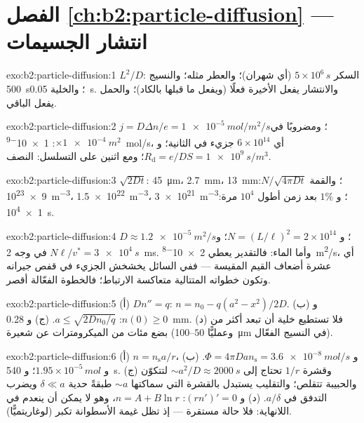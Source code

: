 \section*{الفصل \ref{ch:b2:particle-diffusion} --- انتشار الجسيمات}

\begin{solution}{exo:b2:particle-diffusion:1}
$L^2/D$: السكر $5 \times 10^6\,\unit{s}$ (أي شهران)؛ والعطر مثله؛
والنسيج \qty{500}{s}؛ والخلية \qty{0.05}{s}. والانتشار يفعل الأخيرة
فعلًا (ويفعل ما قبلها بالكاد)؛ والحمل يفعل الباقي.
\end{solution}

\begin{solution}{exo:b2:particle-diffusion:2}
$j = D\Delta n/e = \qty{1e-5}{mol/m^2/s}$؛ ومضروبًا في $\times \qty{1e-4}{m^2}$:
\qty{1e-9}{mol/s}، أي $6 \times 10^{14}$ جزيء في الثانية؛
و $R_{\text{d}} = e/DS = \qty{1e9}{s/m^3}$؛ ومع اثنين على التسلسل: النصف.
\end{solution}

\begin{solution}{exo:b2:particle-diffusion:3}
$\sqrt{2Dt}$: \qty{45}{\micro m}، \qty{2.7}{mm}، \qty{13}{mm}؛ والقمة $N/\sqrt{4\pi
Dt}$: \qty{9e23}{m^{-3}}، \qty{1.5e22}{m^{-3}}، \qty{3e21}{m^{-3}}؛ و $1\%$
بعد زمن أطول $10^4$ مرة: \qty{1e4}{s}.
\end{solution}

\begin{solution}{exo:b2:particle-diffusion:4}
$D \approx \qty{1.2e-5}{m^2/s}$؛ و $N = (L/\ell)^2 = 2 \times 10^{14}$؛ و $N\ell/v^*
= \qty{3e4}{s}$ في وجه \qty{2}{ms}. وأما الماء: فالتقدير يعطي
\qty{2e-8}{m^2/s}، أي عشرة أضعاف القيم المقيسة --- ففي السائل
يخشخش الجزيء في قفص جيرانه وتكون خطواته المتتالية
متعاكسة الارتباط؛ فالخطوة الفعّالة أقصر.
\end{solution}

\begin{solution}{exo:b2:particle-diffusion:5}
(أ) $Dn'' = q$: $n = n_0 - q(a^2 - x^2)/2D$. (ب) و $n(0) \ge 0$: $a \le
\sqrt{2Dn_0/q}$. (ج) و \qty{0.28}{mm}. (د) فلا تستطيع خلية أن تبعد أكثر من
بضع مئات من الميكرومترات عن شعيرة (وعمليًّا $50$--\qty{100}{\micro m}
في النسيج الفعّال).
\end{solution}

\begin{solution}{exo:b2:particle-diffusion:6}
(أ) $n = n_{\text{s}}a/r$، و $\Phi = 4\pi D a n_{\text{s}} = \qty{3.6e-8}{mol/s}$.
(ب) و $1.95 \times 10^{-5}\,\unit{mol}$؛ و \qty{540}{s}. (ج) وقشرة $1/r$ تحتاج إلى
$\sim a^2/D \approx \qty{2000}{s}$ لتتكوّن والحبيبة تتقلص؛ والتقليب
يستبدل بالقشرة التي سماكتها $\sim a$ طبقةً حدية $\delta \ll a$
ويضرب التدفق في $a/\delta$. (د) و $(rn')' = 0$: $n = A + B\ln r$،
وهو لا يمكن أن ينعدم في اللانهاية: فلا حالة مستقرة --- إذ تظل غيمة
الأسطوانة تكبر (لوغاريتميًّا).
\end{solution}

